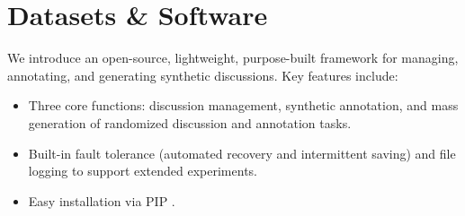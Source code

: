\section{Datasets \& Software}
\label{sec:data-soft}

We introduce \syndisco an open-source, lightweight, purpose-built framework for managing, annotating, and generating synthetic discussions. Key features include: 
\begin{itemize}[nosep, noitemsep]
    \item  Three core functions: discussion management, synthetic annotation, and mass generation of randomized discussion and annotation tasks.
    \item  Built-in fault tolerance (automated recovery and intermittent saving) and file logging to support extended experiments.
    \item Easy installation via PIP \pip.
\end{itemize}     
